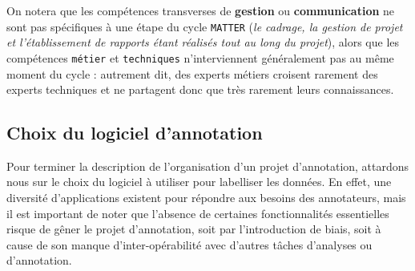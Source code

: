 		On notera que les compétences transverses de \textbf{gestion} ou \textbf{communication} ne sont pas spécifiques à une étape du cycle \texttt{MATTER} (\textit{le cadrage, la gestion de projet et l'établissement de rapports étant réalisés tout au long du projet}), alors que les compétences \texttt{métier} et \texttt{techniques} n'interviennent généralement pas au même moment du cycle : autrement dit, des experts métiers croisent rarement des experts techniques et ne partagent donc que très rarement leurs connaissances.
	
	
	\subsection{Choix du logiciel d'annotation}
	\label{section:2.2.3-ORGANISATION-ANNOTATION-LOGICIELS}
	
		Pour terminer la description de l'organisation d'un projet d'annotation, attardons nous sur le choix du logiciel à utiliser pour labelliser les données.
		En effet, une diversité d'applications existent pour répondre aux besoins des annotateurs, mais il est important de noter que l'absence de certaines fonctionnalités essentielles risque de gêner le projet d'annotation, soit par l'introduction de biais, soit à cause de son manque d'inter-opérabilité avec d'autres tâches d'analyses ou d'annotation.
		
